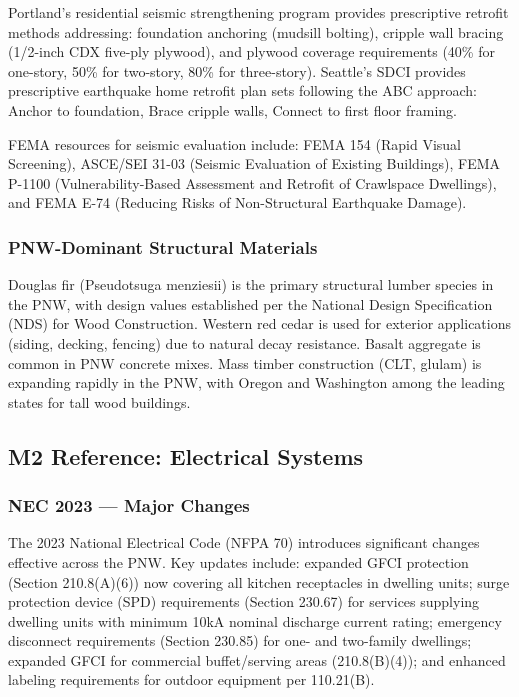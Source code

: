 \documentclass[11pt,letterpaper]{article}
\begin{document}
Portland's residential seismic strengthening program provides prescriptive retrofit methods addressing: foundation anchoring (mudsill bolting), cripple wall bracing (1/2-inch CDX five-ply plywood), and plywood coverage requirements (40\% for one-story, 50\% for two-story, 80\% for three-story). Seattle's SDCI provides prescriptive earthquake home retrofit plan sets following the ABC approach: Anchor to foundation, Brace cripple walls, Connect to first floor framing.

FEMA resources for seismic evaluation include: FEMA 154 (Rapid Visual Screening), ASCE/SEI 31-03 (Seismic Evaluation of Existing Buildings), FEMA P-1100 (Vulnerability-Based Assessment and Retrofit of Crawlspace Dwellings), and FEMA E-74 (Reducing Risks of Non-Structural Earthquake Damage).

\subsubsection{PNW-Dominant Structural Materials}

Douglas fir (Pseudotsuga menziesii) is the primary structural lumber species in the PNW, with design values established per the National Design Specification (NDS) for Wood Construction. Western red cedar is used for exterior applications (siding, decking, fencing) due to natural decay resistance. Basalt aggregate is common in PNW concrete mixes. Mass timber construction (CLT, glulam) is expanding rapidly in the PNW, with Oregon and Washington among the leading states for tall wood buildings.

\subsection{M2 Reference: Electrical Systems}

\subsubsection{NEC 2023 --- Major Changes}

The 2023 National Electrical Code (NFPA 70) introduces significant changes effective across the PNW. Key updates include: expanded GFCI protection (Section 210.8(A)(6)) now covering all kitchen receptacles in dwelling units; surge protection device (SPD) requirements (Section 230.67) for services supplying dwelling units with minimum 10kA nominal discharge current rating; emergency disconnect requirements (Section 230.85) for one- and two-family dwellings; expanded GFCI for commercial buffet/serving areas (210.8(B)(4)); and enhanced labeling requirements for outdoor equipment per 110.21(B).
\end{document}
